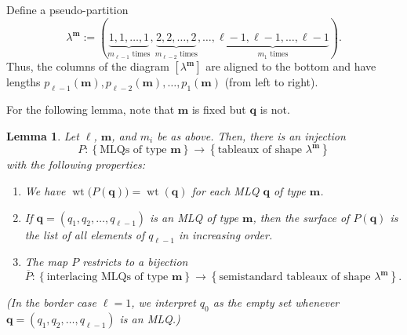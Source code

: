 \documentclass[reqno]{amsart}
\newcommand{\0}{\phantom{c}}
\newcommand{\diag}[1]{\left[#1\right]} %
\DeclareMathOperator{\wt}{wt} %
\newcommand{\mm}{\mathbf{m}}
\newcommand{\qq}{\mathbf{q}}
\newcommand{\NN}{\mathbb{N}}
\newcommand{\set}[1]{\left\{ #1 \right\}}
\newcommand{\tup}[1]{\left( #1 \right)}
\theoremstyle{plain}
\newtheorem{lemma}[thm]{Lemma}
\theoremstyle{definition}
\numberwithin{equation}{section}
\begin{document}

Define a pseudo-partition
\begin{equation}
\label{eq.determinant_form.interlacing.lam}
\lambda^{\mm} := (
  \underbrace{1,1,\ldots,1}_{m_{\ell-1}\text{ times}},
  \underbrace{2,2,\ldots,2}_{m_{\ell-2}\text{ times}},
  \ldots,
  \underbrace{\ell-1,\ell-1,\ldots,\ell-1}_{m_1\text{ times}}
).
\end{equation}
Thus, the columns of the diagram $\diag{\lambda^{\mm}}$ are aligned to the bottom and have lengths $p_{\ell-1}(\mm), p_{\ell-2}(\mm), \dotsc, p_1(\mm)$ (from left to right).

For the following lemma, note that $\mm$ is fixed but $\qq$ is not.

\begin{lemma}
\label{lem:determinant_form.bij1}
Let $\ell$, $\mm$, and $m_i$ be as above.
Then, there is an injection
\[
P \colon \set{ \text{MLQs of type } \mm } \to \set{ \text{tableaux of shape } \lambda^{\mm} }
\]
with the following properties:
\begin{enumerate}
\item[(a)] We have $\wt\bigl(  P(\qq) \bigr) = \wt(\qq)$ for each MLQ $\qq$ of type $\mm$.

\item[(b)] If $\qq = \tup{q_1, q_2, \dotsc, q_{\ell-1}}$ is an MLQ of type $\mm$, then the surface of $P(\qq)$ is the list of all elements of $q_{\ell-1}$ in increasing order.

\item[(c)] The map $P$ restricts to a bijection
\[
\overline{P} \colon \set{\text{interlacing MLQs of type } \mm}  \to \set{  \text{semistandard tableaux of shape } \lambda^{\mm}}.
\]
\end{enumerate}
(In the border case $\ell = 1$, we interpret $q_0$ as the empty set whenever $\qq = \tup{q_1, q_2, \dotsc, q_{\ell-1}}$ is an MLQ.)
\end{lemma}
\end{document}
